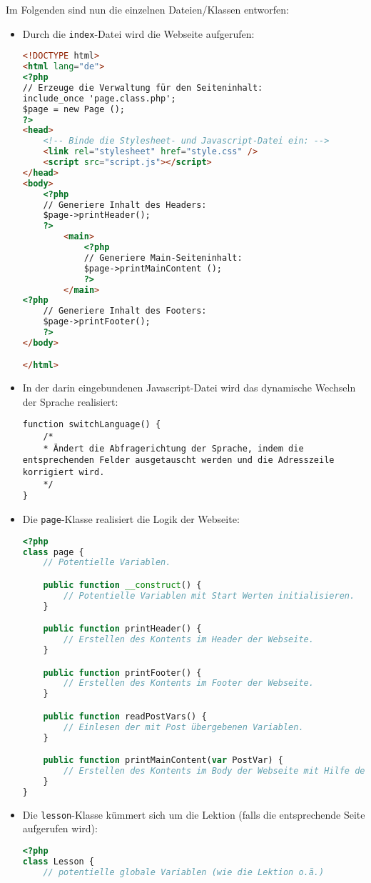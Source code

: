 \documentclass{scrartcl}
\begin{document}
Im Folgenden sind nun die einzelnen Dateien/Klassen entworfen:
\begin{itemize}
\item Durch die \lstinline`index`-Datei wird die Webseite aufgerufen:
\begin{lstlisting}[language=html]
<!DOCTYPE html>
<html lang="de">
<?php
// Erzeuge die Verwaltung für den Seiteninhalt:
include_once 'page.class.php';
$page = new Page ();
?>
<head>
	<!-- Binde die Stylesheet- und Javascript-Datei ein: -->
	<link rel="stylesheet" href="style.css" />
	<script src="script.js"></script>
</head>
<body>
	<?php
	// Generiere Inhalt des Headers:
	$page->printHeader();
	?>
		<main>
			<?php
			// Generiere Main-Seiteninhalt:
			$page->printMainContent ();
			?>
		</main>
<?php
	// Generiere Inhalt des Footers:
	$page->printFooter();
	?>
</body>

</html>
\end{lstlisting}
\item In der darin eingebundenen Javascript-Datei wird das dynamische Wechseln der Sprache realisiert:
\begin{lstlisting}[]
function switchLanguage() {
	/*
	* Ändert die Abfragerichtung der Sprache, indem die entsprechenden Felder ausgetauscht werden und die Adresszeile korrigiert wird.
	*/
}
\end{lstlisting}
\item Die \lstinline`page`-Klasse realisiert die Logik der Webseite:
\begin{lstlisting}[language=php]
<?php
class page {
	// Potentielle Variablen.

	public function __construct() {
		// Potentielle Variablen mit Start Werten initialisieren.
	}

	public function printHeader() {
		// Erstellen des Kontents im Header der Webseite.
	}	

	public function printFooter() {
		// Erstellen des Kontents im Footer der Webseite.
	}

	public function readPostVars() {
		// Einlesen der mit Post übergebenen Variablen.
	}

	public function printMainContent(var PostVar) {
		// Erstellen des Kontents im Body der Webseite mit Hilfe der übergebenen Variablen.
	}
}
\end{lstlisting}
\item Die \lstinline`lesson`-Klasse kümmert sich um die Lektion (falls die entsprechende Seite aufgerufen wird):
\begin{lstlisting}[language=php]
<?php
class Lesson {
	// potentielle globale Variablen (wie die Lektion o.ä.)
	

\end{lstlisting}
\end{itemize}
\end{document}
